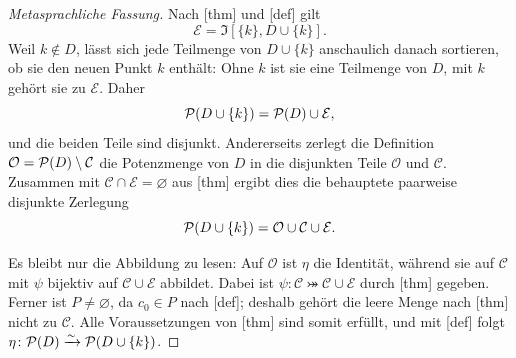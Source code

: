 \documentclass[main.tex]{subfiles}
\begin{document}
\begin{proof}[Metasprachliche Fassung]
Nach [thm] und
[def] gilt
\[
  \mathcal E=\mathfrak I[\{k\},D\cup\{k\}].
\]
Weil \(k\notin D\),
lässt sich jede Teilmenge von \(D\cup\{k\}\) anschaulich danach
sortieren, ob sie den neuen Punkt \(k\) enthält: Ohne \(k\) ist sie eine
Teilmenge von \(D\), mit \(k\) gehört sie zu \(\mathcal E\). Daher
\[
  \mathcal{P}(D\cup\{k\})=\mathcal{P}(D)\cup\mathcal E,
\]
und die beiden Teile sind disjunkt. Andererseits zerlegt die Definition
\(\mathcal O=\mathcal{P}(D)\setminus\mathcal C\) die Potenzmenge von \(D\)
in die disjunkten Teile \(\mathcal O\) und \(\mathcal C\). Zusammen mit
\(\mathcal C\cap\mathcal E=\varnothing\) aus
[thm] ergibt dies die
behauptete paarweise disjunkte Zerlegung
\[
  \mathcal{P}(D\cup\{k\})=\mathcal O\cup\mathcal C\cup\mathcal E.
\]

Es bleibt nur die Abbildung zu lesen: Auf \(\mathcal O\) ist \(\eta\)
die Identität, während sie auf \(\mathcal C\) mit \(\psi\) bijektiv auf
\(\mathcal C\cup\mathcal E\) abbildet. Dabei ist
\(\psi\colon\mathcal C\bij\mathcal C\cup\mathcal E\) durch
[thm] gegeben. Ferner
ist \(P\neq\varnothing\), da \(c_0\in P\) nach
[def]; deshalb gehört die leere
Menge nach [thm] nicht zu
\(\mathcal C\). Alle Voraussetzungen von
[thm] sind somit erfüllt, und
mit [def] folgt
\(\eta\colon\mathcal{P}(D)\xrightarrow{\sim}\mathcal{P}(D\cup\{k\})\).
\end{proof}
\end{document}
